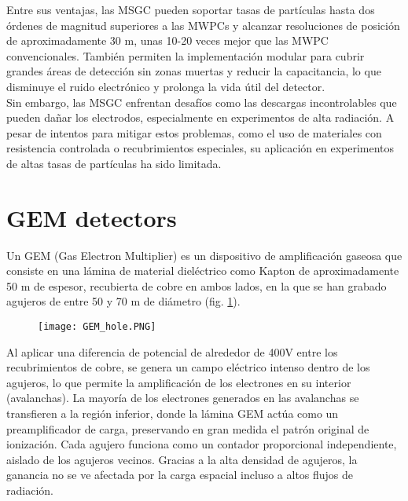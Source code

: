 \documentclass{article}
\begin{document}
\noindent Entre sus ventajas, las MSGC pueden soportar tasas de partículas hasta dos órdenes de magnitud superiores a las MWPCs y alcanzar resoluciones de posición de aproximadamente 30 \textmu m, unas 10-20 veces mejor que las MWPC convencionales. También permiten la implementación modular para cubrir grandes áreas de detección sin zonas muertas y reducir la capacitancia, lo que disminuye el ruido electrónico y prolonga la vida útil del detector.\\

\noindent Sin embargo, las MSGC enfrentan desafíos como las descargas incontrolables que pueden dañar los electrodos, especialmente en experimentos de alta radiación. A pesar de intentos para mitigar estos problemas, como el uso de materiales con resistencia controlada o recubrimientos especiales, su aplicación en experimentos de altas tasas de partículas ha sido limitada.\\


\section{GEM detectors}

\noindent Un GEM (Gas Electron Multiplier) es un dispositivo de amplificación gaseosa que consiste en una lámina de material dieléctrico como Kapton de aproximadamente 50 \textmu m de espesor, recubierta de cobre en ambos lados, en la que se han grabado agujeros de entre 50 y 70 \textmu m de diámetro (fig. \ref{fig:gem_hole}).

\begin{figure}[H]
    \centering
    \texttt{[image: GEM\_hole.PNG]}
    \caption{}
    \label{fig:gem_hole}
\end{figure}
\noindent Al aplicar una diferencia de potencial de alrededor de 400V entre los recubrimientos de cobre, se genera un campo eléctrico intenso dentro de los agujeros, lo que permite la amplificación de los electrones en su interior (avalanchas). La mayoría de los electrones generados en las avalanchas se transfieren a la región inferior, donde la lámina GEM actúa como un preamplificador de carga, preservando en gran medida el patrón original de ionización. Cada agujero funciona como un contador proporcional independiente, aislado de los agujeros vecinos. Gracias a la alta densidad de agujeros, la ganancia no se ve afectada por la carga espacial incluso a altos flujos de radiación.\\ 
\end{document}
